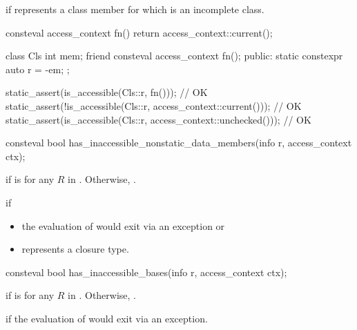 \begin{itemdescr}
\pnum
\throws
{} if
   represents a class member
  for which  is an incomplete class.

\pnum
\begin{example}
\begin{codeblock}
consteval access_context fn() {
  return access_context::current();
}

class Cls {
  int mem;
  friend consteval access_context fn();
public:
  static constexpr auto r = ^^mem;
};

static_assert(is_accessible(Cls::r, fn()));                             // OK
static_assert(!is_accessible(Cls::r, access_context::current()));       // OK
static_assert(is_accessible(Cls::r, access_context::unchecked()));      // OK
\end{codeblock}
\end{example}
\end{itemdescr}

%
\begin{itemdecl}
consteval bool has_inaccessible_nonstatic_data_members(info r, access_context ctx);
\end{itemdecl}

\begin{itemdescr}
\pnum
\returns
{} if  is 
for any $R$ in .
Otherwise, .

\pnum
\throws
{} if
\begin{itemize}
\item
  the evaluation of
  would exit via an exception or
\item
   represents a closure type.
\end{itemize}
\end{itemdescr}

\begin{itemdecl}
consteval bool has_inaccessible_bases(info r, access_context ctx);
\end{itemdecl}

\begin{itemdescr}
\pnum
\returns
{} if  is 
for any $R$ in .
Otherwise, .

\pnum
\throws
{} if the evaluation of
would exit via an exception.
\end{itemdescr}


